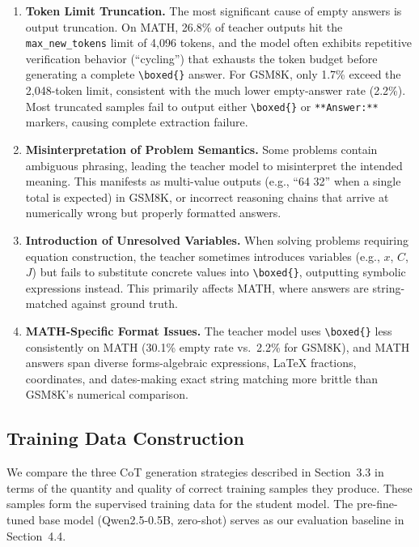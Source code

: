 \documentclass{article}
\begin{document}
\begin{enumerate}[leftmargin=*]
    \item \textbf{Token Limit Truncation.} The most significant cause of empty answers is output truncation. On MATH, 26.8\% of teacher outputs hit the \texttt{max\_new\_tokens} limit of 4,096 tokens, and the model often exhibits repetitive verification behavior (``cycling'') that exhausts the token budget before generating a complete \texttt{\textbackslash{}boxed\{\}} answer. For GSM8K, only 1.7\% exceed the 2,048-token limit, consistent with the much lower empty-answer rate (2.2\%). Most truncated samples fail to output either \texttt{\textbackslash{}boxed\{\}} or \texttt{**Answer:**} markers, causing complete extraction failure.
    \item \textbf{Misinterpretation of Problem Semantics.} Some problems contain ambiguous phrasing, leading the teacher model to misinterpret the intended meaning. This manifests as multi-value outputs (e.g., ``64 32'' when a single total is expected) in GSM8K, or incorrect reasoning chains that arrive at numerically wrong but properly formatted answers.
    \item \textbf{Introduction of Unresolved Variables.} When solving problems requiring equation construction, the teacher sometimes introduces variables (e.g., $x$, $C$, $J$) but fails to substitute concrete values into \texttt{\textbackslash{}boxed\{\}}, outputting symbolic expressions instead. This primarily affects MATH, where answers are string-matched against ground truth.
    \item \textbf{MATH-Specific Format Issues.} The teacher model uses \texttt{\textbackslash{}boxed\{\}} less consistently on MATH (30.1\% empty rate vs.\ 2.2\% for GSM8K), and MATH answers span diverse forms-algebraic expressions, LaTeX fractions, coordinates, and dates-making exact string matching more brittle than GSM8K's numerical comparison.
\end{enumerate}

\subsection{Training Data Construction}

We compare the three CoT generation strategies described in Section~3.3 in terms of the quantity and quality of correct training samples they produce. These samples form the supervised training data for the student model. The pre-fine-tuned base model (Qwen2.5-0.5B, zero-shot) serves as our evaluation baseline in Section~4.4.
\end{document}
